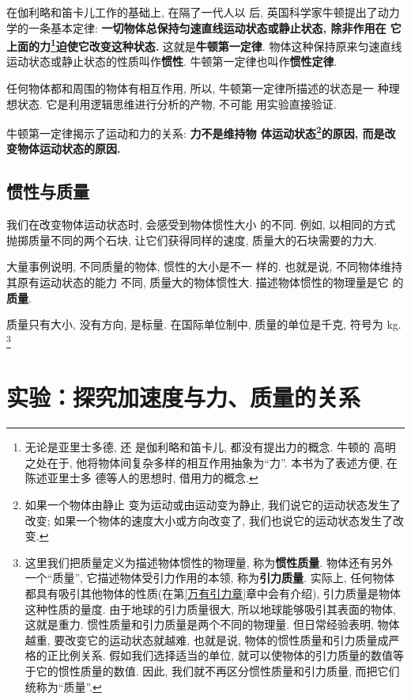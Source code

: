 \documentclass[11pt,a4paper]{ctexbook}
\begin{document}
在伽利略和笛卡儿工作的基础上, 在隔了一代人以
后, 英国科学家牛顿提出了动力学的一条基本定律:
\textbf{一切物体总保持匀速直线运动状态或静止状态, 除非作用在
它上面的力\footnote{无论是亚里士多德, 还
是伽利略和笛卡儿, 都没有提出力的概念. 牛顿的
高明之处在于, 他将物体间复杂多样的相互作用抽象为``力''. 本书为了表述方便, 在陈述亚里士多
德等人的思想时, 借用力的概念.}迫使它改变这种状态.} 这就是\textbf{牛顿第一定律}.
物体这种保持原来匀速直线运动状态或静止状态的性质叫作\textbf{惯性}.
牛顿第一定律也叫作\textbf{惯性定律}.

任何物体都和周围的物体有相互作用, 所以, 牛顿第一定律所描述的状态是一
种理想状态. 它是利用逻辑思维进行分析的产物, 不可能
用实验直接验证.

牛顿第一定律揭示了运动和力的关系: \textbf{力不是维持物
体运动状态\footnote{如果一个物体由静止
变为运动或由运动变为静止, 我们说它的运动状态发生了改变;
如果一个物体的速度大小或方向改变了, 我们也说它的运动状态发生了改变.}的原因,
而是改变物体运动状态的原因. }

\subsection{惯性与质量}

我们在改变物体运动状态时, 会感受到物体惯性大小
的不同. 例如, 以相同的方式抛掷质量不同的两个石块,
让它们获得同样的速度, 质量大的石块需要的力大.

大量事例说明, 不同质量的物体, 惯性的大小是不一
样的. 也就是说, 不同物体维持其原有运动状态的能力
不同, 质量大的物体惯性大. 描述物体惯性的物理量是它
的\textbf{质量}.

质量只有大小, 没有方向, 是标量. 在国际单位制中, 质量的单位是千克, 符号为 kg.
\footnote{这里我们把质量定义为描述物体惯性的物理量, 称为\textbf{惯性质量}. 物体还有另外
一个``质量'', 它描述物体受引力作用的本领, 称为\textbf{引力质量}.
实际上, 任何物体都具有吸引其他物体的性质(在第\ref{万有引力章}章中会有介绍), 引力质量是物体这种性质的量度. 由于地球的引力质量很大, 所以地球能够吸引其表面的物体, 这就是重力.
惯性质量和引力质量是两个不同的物理量. 但日常经验表明, 物体越重, 要改变它的运动状态就越难,
也就是说, 物体的惯性质量和引力质量成严格的正比例关系. 假如我们选择适当的单位, 就可以使物体的引力质量的数值等于它的惯性质量的数值.
因此, 我们就不再区分惯性质量和引力质量, 而把它们统称为``质量''.}


\section{实验：探究加速度与力、质量的关系}
\end{document}
